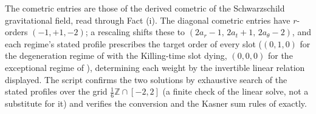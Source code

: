 The cometric entries are those of the derived cometric of the Schwarzschild gravitational field, read through Fact (i). The diagonal cometric entries have $r$-orders $(-1, +1, -2)$; a rescaling shifts these to $(2a_r - 1,\, 2a_t + 1,\, 2a_\theta - 2)$, and each regime's stated profile prescribes the target order of every slot ($(0, 1, 0)$ for the degeneration regime of  with the Killing-time slot dying, $(0,0,0)$ for the exceptional regime of ), determining each weight by the invertible linear relation displayed. The script confirms the two solutions by exhaustive search of the stated profiles over the grid $\tfrac16\mathbb{Z} \cap [-2,2]$ (a finite check of the linear solve, not a substitute for it) and verifies the conversion and the Kasner sum rules of  exactly.
